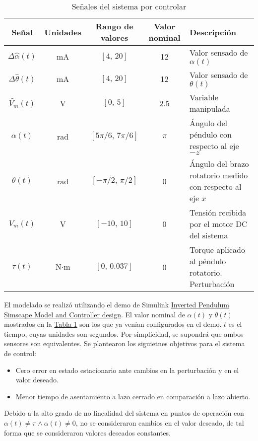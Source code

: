 \begin{table}
\centering
\begin{tabular}{ccccp{3cm}}
\toprule
Señal &  Unidades & Rango de valores & Valor nominal & Descripción\\
\midrule
$\Delta \hat{\alpha}(t)$ & mA & $[4,\, 20]$ & 12& Valor sensado de $\alpha(t)$\\
$\Delta \hat{\theta}(t)$ & mA & $[ 4,\, 20]$ & 12& Valor sensado de $\theta(t)$\\
$\widetilde{V_m}(t)$ & V & $[0,\, 5]$ & 2.5       & Variable manipulada\\
$\alpha(t)$ & rad & $[ 5\pi/6,\, 7\pi/6]$ & $\pi$                           & Ángulo del péndulo con respecto al eje $-z$\\
$\theta(t)$ & rad & $[-\pi/2,\,\pi/2]$ & 0& Ángulo del brazo rotatorio medido con respecto al eje $x$\\
$V_m(t)$ & V & $[-10,\, 10]$ & 0& Tensión recibida por el motor DC del sistema\\
$\tau(t)$ & $\text{N}\cdot\text{m}$ & $[0,\,0.037]$& 0 & Torque aplicado al péndulo rotatorio. Perturbación\\
\bottomrule
\end{tabular}
\caption{Señales del sistema por controlar}
\label{t1}
\end{table}

El modelado se realizó utilizando el demo de Simulink \href{https://la.mathworks.com/matlabcentral/fileexchange/84175-inverted-pendulum-simscape-model-and-controller-design?requestedDomain=}{Inverted Pendulum Simscape Model and Controller design}.
El valor nominal de $\alpha(t)$ y $\theta(t)$ mostrados en la \hyperref[t1]{Tabla 1} son los que ya venían configurados en el demo.
$t$ es el tiempo, cuyas unidades son segundos.
Por simplicidad, se supondrá que ambos sensores son equivalentes.
Se plantearon los siguietnes objetivos para el sistema de control:
\begin{itemize}
    \item Cero error en estado estacionario ante cambios en la perturbación y en el valor deseado.
    \item Menor tiempo de asentamiento a lazo cerrado en comparación a lazo abierto.
\end{itemize}

Debido a la alto grado de no linealidad del sistema en puntos de operación con $\alpha(t) \neq \pi \wedge \alpha(t) \neq 0$, no se consideraron cambios en el valor deseado, de tal forma que se consideraron valores deseados constantes. 

